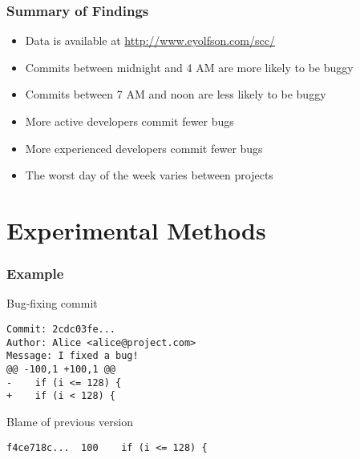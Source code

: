 \documentclass[aspectratio=43]{beamer}
\begin{document}
\begin{frame}
  \frametitle{Summary of Findings}
  
  \begin{itemize}
    \item Data is available at \url{http://www.eyolfson.com/scc/}

    \item Commits between midnight and 4 AM are more likely to be buggy

    \item Commits between 7 AM and noon are less likely to be buggy

    \item More active developers commit fewer bugs

    \item More experienced developers commit fewer bugs

    \item The worst day of the week varies between projects
  \end{itemize}
\end{frame}

\section{Experimental Methods}
\begin{frame}[fragile]
  \frametitle{Example}

  \begin{block}{Bug-fixing commit}
    \begin{lstlisting}
Commit: 2cdc03fe...
Author: Alice <alice@project.com>
Message: I fixed a bug!
@@ -100,1 +100,1 @@
-    if (i <= 128) {
+    if (i < 128) {
    \end{lstlisting}
  \end{block}

  \begin{block}{Blame of previous version}
    \begin{lstlisting}
f4ce718c...  100    if (i <= 128) {
    \end{lstlisting}
  \end{block}

\end{frame}
\end{document}
